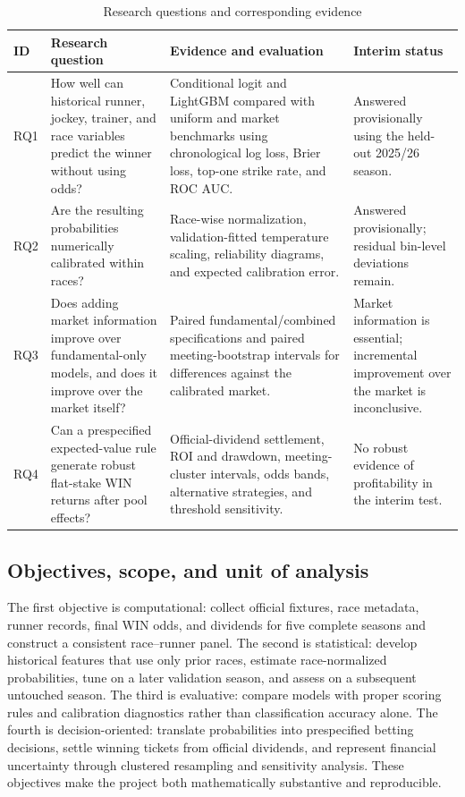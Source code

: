 \begin{table}[htbp]
\centering
\caption{Research questions and corresponding evidence}\label{tab:researchquestions}
\small
\begin{tabularx}{\textwidth}{L{0.8cm} L{5.3cm} Y L{3.2cm}}
\toprule
\textbf{ID} & \textbf{Research question} & \textbf{Evidence and evaluation} & \textbf{Interim status} \\
\midrule
RQ1 & How well can historical runner, jockey, trainer, and race variables predict the winner without using odds? & Conditional logit and LightGBM compared with uniform and market benchmarks using chronological log loss, Brier loss, top-one strike rate, and ROC AUC. & Answered provisionally using the held-out 2025/26 season. \\
\addlinespace
RQ2 & Are the resulting probabilities numerically calibrated within races? & Race-wise normalization, validation-fitted temperature scaling, reliability diagrams, and expected calibration error. & Answered provisionally; residual bin-level deviations remain. \\
\addlinespace
RQ3 & Does adding market information improve over fundamental-only models, and does it improve over the market itself? & Paired fundamental/combined specifications and paired meeting-bootstrap intervals for differences against the calibrated market. & Market information is essential; incremental improvement over the market is inconclusive. \\
\addlinespace
RQ4 & Can a prespecified expected-value rule generate robust flat-stake WIN returns after pool effects? & Official-dividend settlement, ROI and drawdown, meeting-cluster intervals, odds bands, alternative strategies, and threshold sensitivity. & No robust evidence of profitability in the interim test. \\
\bottomrule
\end{tabularx}
\end{table}

\subsection{Objectives, scope, and unit of analysis}\label{sec:scope}
The first objective is computational: collect official fixtures, race metadata, runner records, final WIN odds, and dividends for five complete seasons and construct a consistent race--runner panel. The second is statistical: develop historical features that use only prior races, estimate race-normalized probabilities, tune on a later validation season, and assess on a subsequent untouched season. The third is evaluative: compare models with proper scoring rules and calibration diagnostics rather than classification accuracy alone. The fourth is decision-oriented: translate probabilities into prespecified betting decisions, settle winning tickets from official dividends, and represent financial uncertainty through clustered resampling and sensitivity analysis. These objectives make the project both mathematically substantive and reproducible.


